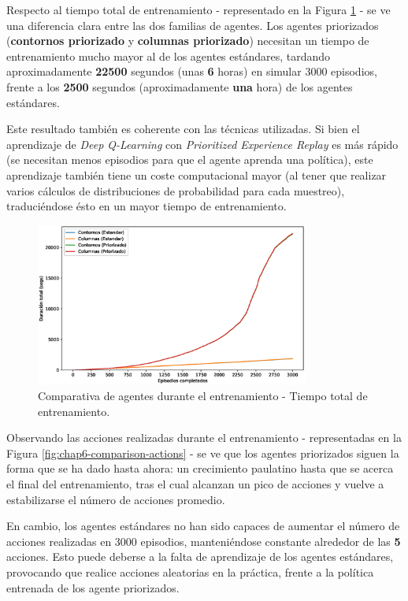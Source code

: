 Respecto al tiempo total de entrenamiento - representado en la Figura \ref{fig:chap6-comparison-time} - se ve una diferencia clara entre las dos familias de agentes. Los agentes priorizados (\textbf{contornos priorizado} y \textbf{columnas priorizado}) necesitan un tiempo de entrenamiento mucho mayor al de los agentes estándares, tardando aproximadamente \textbf{22500} segundos (unas \textbf{6} horas) en simular 3000 episodios, frente a los \textbf{2500} segundos (aproximadamente \textbf{una} hora) de los agentes estándares.

Este resultado también es coherente con las técnicas utilizadas. Si bien el aprendizaje de \textit{Deep Q-Learning} con \textit{Prioritized Experience Replay} es más rápido (se necesitan menos episodios para que el agente aprenda una política), este aprendizaje también tiene un coste computacional mayor (al tener que realizar varios cálculos de distribuciones de probabilidad para cada muestreo), traduciéndose ésto en un mayor tiempo de entrenamiento.

\begin{figure}[h]
    \centering
    \includegraphics[width=0.8\textwidth]{imagenes/cap6/comparison/cumulative_smoothed_times.eps}
    \caption{Comparativa de agentes durante el entrenamiento - Tiempo total de entrenamiento.}
    \label{fig:chap6-comparison-time}
\end{figure}

Observando las acciones realizadas durante el entrenamiento - representadas en la Figura \ref{fig:chap6-comparison-actions} - se ve que los agentes priorizados siguen la forma que se ha dado hasta ahora: un crecimiento paulatino hasta que se acerca el final del entrenamiento, tras el cual alcanzan un pico de acciones y vuelve a estabilizarse el número de acciones promedio. 

En cambio, los agentes estándares no han sido capaces de aumentar el número de acciones realizadas en 3000 episodios, manteniéndose constante alrededor de las \textbf{5} acciones. Esto puede deberse a la falta de aprendizaje de los agentes estándares, provocando que realice acciones aleatorias en la práctica, frente a la política entrenada de los agente priorizados.

